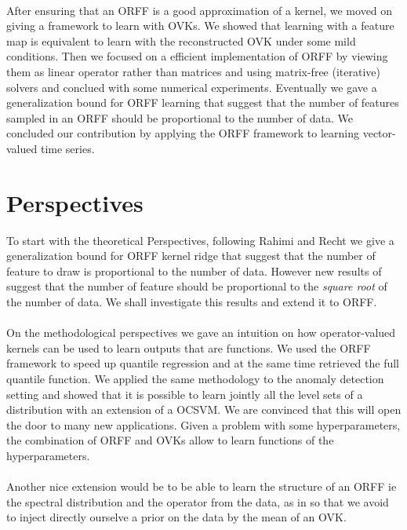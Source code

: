 \paragraph{}
After ensuring that an \acs{ORFF} is a good approximation of a kernel, we
moved on giving a framework to learn with \aclp{OVK}. We showed that
learning with a feature map is equivalent to learn with the reconstructed
\acs{OVK} under some mild conditions. Then we focused on a efficient
implementation of \acs{ORFF} by viewing them as linear operator rather than
matrices and using matrix-free (iterative) solvers and conclued with some
numerical experiments. Eventually we gave a generalization bound for
\acs{ORFF} learning that suggest that the number of features sampled in an
\acs{ORFF} should be proportional to the number of data. We concluded our
contribution by applying the \acs{ORFF} framework to learning vector-valued
time series.

\section{Perspectives}
To start with the theoretical Perspectives, following Rahimi and Recht we
give a generalization bound for \acs{ORFF} kernel ridge that suggest that
the number of feature to draw is proportional to the number of data.
However new results of \citet{rudi2016generalization} suggest that the
number of feature should be proportional to the \emph{square root} of the
number of data. We shall investigate this results and extend it to
\acs{ORFF}.
\paragraph{}
On the methodological perspectives we gave an intuition on how operator-valued
kernels can be used to learn outputs that are functions. We used the \acs{ORFF}
framework to speed up quantile regression and at the same time retrieved the
full quantile function. We applied the same methodology to the anomaly
detection setting and showed that it is possible to learn jointly all the level
sets of a distribution with an extension of a \acl{OCSVM}. We are convinced
that this will open the door to many new applications. Given a problem with
some hyperparameters, the combination of \acs{ORFF} and \aclp{OVK} allow to
learn functions of the hyperparameters.
\paragraph{}
Another nice extension would be to be able to learn the structure of an
\acs{ORFF} \acs{ie} the spectral distribution and the operator from the data,
as in \citet{Yang2015} so that we avoid to inject directly ourselve a prior on
the data by the mean of an \acl{OVK}.
